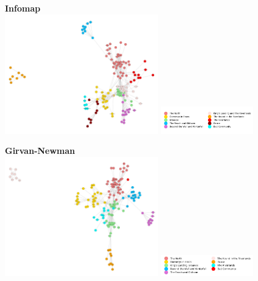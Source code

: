 \documentclass[10pt,twocolumn,letterpaper]{article}
\begin{document}
\begin{center}
    \textbf{Infomap}  \\

    \includegraphics[width=0.5\textwidth]{img/s6/communities_infomap.jpg}
    \includegraphics[width=0.3\textwidth]{img/s6/infomap_legend.jpg}\\
    \caption{\small{$\#communities=10$, $modularity=0.65$}}
\end{center}


\begin{center}
    \textbf{Girvan-Newman} \\
    \includegraphics[width=0.5\textwidth]{img/s6/communities_g-n.jpg}
    \includegraphics[width=0.3\textwidth]{img/s6/g-n_legend.jpg}\\
    \caption{\small{$\#communities=9$, $modularity=0.644$}}
\end{center}
\end{document}
